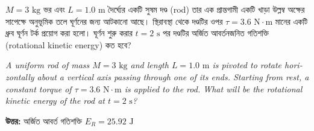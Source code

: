 \documentclass[12pt, a4paper]{article}
\begin{document}
\begin{tcolorbox}[questionbox={প্রশ্ন (Question) 16}]
\noindent
$M = 3\text{ kg}$ ভর এবং $L = 1.0\text{ m}$ দৈর্ঘ্যের একটি সুষম দণ্ড (rod) তার এক প্রান্তগামী একটি খাড়া উল্লম্ব অক্ষের সাপেক্ষে অনুভূমিক তলে ঘূর্ণনের জন্য আটকানো আছে। স্থিরাবস্থা থেকে দণ্ডটির ওপর $\tau = 3.6\text{ N}\cdot\text{m}$ মানের একটি ধ্রুব ঘূর্ণন টর্ক প্রয়োগ করা হলো। ঘূর্ণন শুরু করার $t = 2\text{ s}$ পর দণ্ডটির অর্জিত আবর্তনজনিত গতিশক্তি (rotational kinetic energy) কত হবে?

\vspace{0.8em}
\begin{english}
\noindent\textit{\color{darkgray}
A uniform rod of mass $M = 3\text{ kg}$ and length $L = 1.0\text{ m}$ is pivoted to rotate horizontally about a vertical axis passing through one of its ends. Starting from rest, a constant torque of $\tau = 3.6\text{ N}\cdot\text{m}$ is applied to the rod. What will be the rotational kinetic energy of the rod at $t = 2\text{ s}$?
}
\end{english}
\end{tcolorbox}

\vspace{1em}
\begin{center}
\end{center}
\vspace{1em}

\begin{tcolorbox}[answerbox]
\textbf{\color{success} উত্তর:} অর্জিত আবর্ত গতিশক্তি $E_R = 25.92\text{ J}$
\end{tcolorbox}
\vspace{1em}
\end{document}
